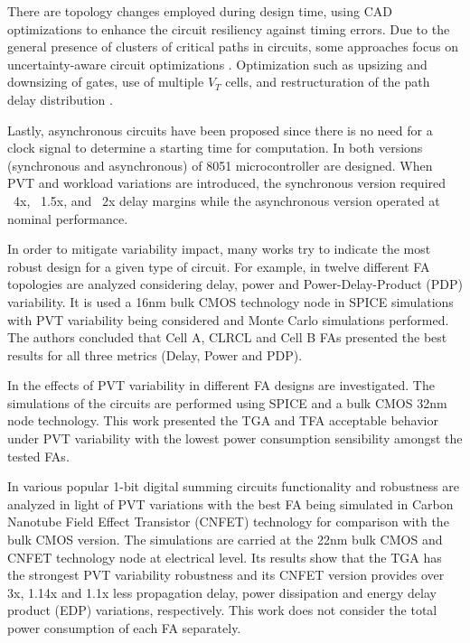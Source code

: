 \documentclass[diss,pgmicro,english]{iiufrgs}
\begin{document}
There are topology changes employed during design time, using CAD optimizations to enhance the circuit resiliency against timing errors. Due to the general presence of clusters of critical paths in circuits,  some approaches focus on uncertainty-aware circuit optimizations \cite{bai2002uncertainty}. Optimization such as upsizing and downsizing of gates, use of multiple $V_T$ cells, and restructuration of the path delay distribution \cite{kahng2010slack}.

Lastly, asynchronous circuits have been proposed since there is no need for a clock signal to determine a starting time for computation. In \cite{chang2013synchronous} both versions (synchronous and  asynchronous) of 8051 microcontroller are designed. When PVT and workload variations are introduced, the synchronous version required ~4x, ~1.5x, and ~2x delay margins while the asynchronous version operated at nominal performance.

In order to mitigate variability impact, many works try to indicate the most robust design for a given type of circuit. For example, in \cite{dokania2013investigation} twelve different FA topologies are analyzed considering delay, power and Power-Delay-Product (PDP) variability. It is used a 16nm bulk CMOS technology node in SPICE simulations with PVT variability being considered and Monte Carlo simulations performed. The authors concluded that Cell A, CLRCL and Cell B FAs presented the best results for all three metrics (Delay, Power and PDP).

In \cite{ames2016investigating} the effects of PVT variability in different FA designs are investigated. The simulations of the circuits are performed using SPICE and a bulk CMOS 32nm node technology. This work presented the TGA and TFA acceptable behavior under PVT variability with the lowest power consumption sensibility amongst the tested FAs.

In \cite{islam2011design} various popular 1-bit digital summing circuits functionality and robustness are analyzed in light of PVT variations with the best FA being simulated in Carbon Nanotube Field Effect Transistor (CNFET) technology for comparison with the bulk CMOS version. The simulations are carried at the 22nm bulk CMOS and CNFET technology node at electrical level. Its results show that the TGA has the strongest PVT variability robustness and its CNFET version provides over 3x, 1.14x and 1.1x less propagation delay, power dissipation and energy delay product (EDP) variations, respectively. This work does not consider the total power consumption of each FA separately.
\end{document}
